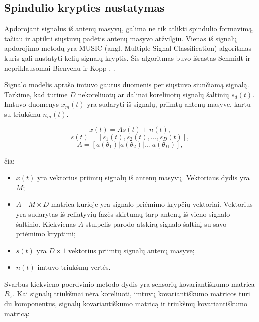 \documentclass[main.tex]{subfiles}
\begin{document}
\subsection{Spindulio krypties nustatymas}\label{sec:music}

Apdorojant signalus iš antenų masyvų, galima ne tik atlikti spindulio
formavimą, tačiau ir aptikti siųstuvų padėtis antenų masyvo atžvilgiu.
Vienas iš signalų apdorojimo metodų yra MUSIC (angl. Multiple Signal Classification)
algoritmas kuris gali nustatyti kelių signalų kryptis.
Šis algoritmas buvo išrastas Schmidt \cite{1143830} ir nepriklausomai
Bienvenu ir Kopp \cite{1171029}, \cite{1164185}.

Signalo modelis aprašo imtuvo gautus duomenis per siųstuvo siunčiamą signalą. Tarkime, kad
turime $D$ nekoreliuotų ar dalinai koreliuotų signalų šaltinių $s_d(t)$. Imtuvo
duomenys $x_m(t)$ yra sudaryti iš signalų, priimtų antenų masyve, kartu su triukšmu
$n_m(t)$.

\begin{equation}
    x(t) = As(t) + n(t),
\end{equation}
\begin{equation}
    s(t) = [s_1(t), s_2(t),...,s_D(t)],
\end{equation}
\begin{equation}
    A = [a(\theta_1) | a(\theta_2) | ... | a(\theta_D)],
\end{equation}

\noindent čia:

\begin{itemize}
    \item $x(t)$ yra vektorius priimtų signalų iš antenų masyvų. Vektoriaus dydis yra $M$;
    \item $A$ - $M\times D$ matrica kurioje yra signalo priėmimo krypčių vektoriai. Vektorius
    yra sudarytas iš reliatyvių fazės skirtumų tarp antenų iš vieno signalo šaltinio. Kiekvienas
    $A$ stulpelis parodo atskirą signalo šaltinį su savo priėmimo kryptimi;
    \item $s(t)$ yra $D\times 1$ vektorius priimtų signalų antenų masyve;
    \item $n(t)$ imtuvo triukšmų vertės.
\end{itemize}

Svarbus kiekvieno poerdvinio metodo dydis yra sensorių kovariantiškumo matrica $R_x$.
Kai signalų triukšmai nėra koreliuoti, imtuvų kovariantiškumo matricos turi du komponentus,
signalų kovariantiškumo matricą ir triukšmų kovariantiškumo matricą:
\end{document}
